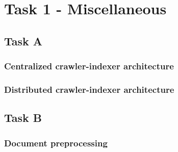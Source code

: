 \section*{Task 1 - Miscellaneous}

\subsection*{Task A}
\subsubsection*{Centralized crawler-indexer architecture}

\subsubsection*{Distributed crawler-indexer architecture}

\subsection*{Task B}
\subsubsection*{Document preprocessing}

